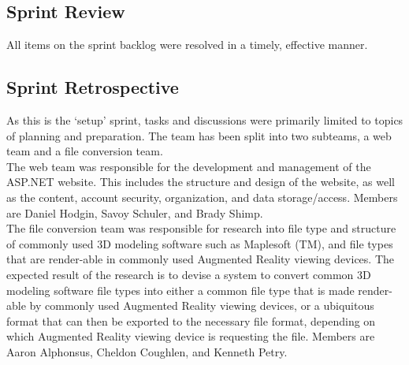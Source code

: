     \subsection{Sprint Review}
    \label{sec:Sprint0_review}
        \hspace{7mm}
        All items on the sprint backlog were resolved in a timely, effective manner.

    \subsection{Sprint Retrospective}
    \label{sec:Sprint0_retrospective}
        \hspace{7mm}
        As this is the `setup' sprint, tasks and discussions were primarily limited to topics of planning and preparation.
        The team has been split into two subteams, a web team and a file conversion team.\\ 

        The web team was responsible for the development and management of the ASP.NET website.  This includes the
        structure and design of the website,  as well as the content, account security, organization, and data 
        storage/access.  Members are Daniel Hodgin, Savoy Schuler, and Brady Shimp.\\

        The file conversion team was responsible for research into file type and structure of commonly used 3D modeling
        software such as Maplesoft (TM), and file types that are render-able in commonly used Augmented Reality viewing devices.
        The expected result of the research is to devise a system to convert common 3D modeling software file types into either
        a common file type that is made render-able by commonly used Augmented Reality viewing devices, or a ubiquitous format
        that can then be exported to the necessary file format, depending on which Augmented Reality viewing device is 
        requesting the file. Members are Aaron Alphonsus, Cheldon Coughlen, and Kenneth Petry.